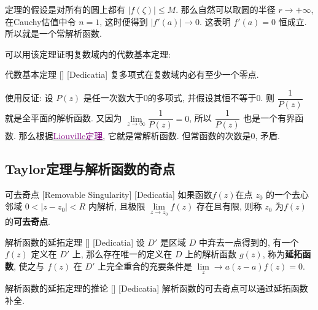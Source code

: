 \documentclass[UTF8]{ctexart}
\newcommand{\hyperrefc}[2]{\hyperref[#1]{\textcolor{purple}{#2}}}
\begin{document}
        \begin{prf}
            定理的假设是对所有的圆上都有 \(|f(\zeta)|\leqslant M\). 那么自然可以取圆的半径 \(r\to+\infty \), 在Cauchy估值中令 \(n=1\), 这时便得到 \(|f'(a)|\to 0\). 这表明 \(f'(a)=0\) 恒成立. 所以就是一个常解析函数. 
        \end{prf}

        可以用该定理证明复数域内的代数基本定理: 

        \begin{thm}
            [UUID]
            {代数基本定理}
            []
            [Dedicatia]
            复多项式在复数域内必有至少一个零点. 
        \end{thm}

        \begin{prf}
            使用反证: 设 \(P(z)\) 是任一次数大于0的多项式, 并假设其恒不等于0. 则 \(\dfrac{1}{P(z)}\) 就是全平面的解析函数. 又因为 \(\lim\limits_{z\to\infty}\dfrac{1}{P(z)}=0\), 所以 \(\dfrac{1}{P(z)}\) 也是一个有界函数. 那么根据\hyperrefc{thm:Liouville}{Liouville定理}, 它就是常解析函数. 但常函数的次数是0, 矛盾. 
        \end{prf}

    \subsection{Taylor定理与解析函数的奇点}

        \begin{dfn}
            [RemovableSingularity]
            {可去奇点}
            [Removable Singularity]
            [Dedicatia]
            如果函数\(f(z)\)在点 \(z_0\) 的一个去心邻域 \(0 < |z - z_0| < R\) 内解析, 且极限 \(\lim\limits_{z \to z_0} f(z)\) 存在且有限, 则称 \(z_0\) 为\(f(z)\)的\textbf{可去奇点}. 
        \end{dfn}

        \begin{thm}
            [UUID]
            {解析函数的延拓定理}
            []
            [Dedicatia]
            设 \(D'\) 是区域 \(D\) 中弃去一点得到的, 有一个  \(f(z)\) 定义在 \(D'\) 上, 那么存在唯一的定义在 \(D\) 上的解析函数 \(g(z)\), 称为\textbf{延拓函数}, 使之与 \(f(z)\) 在 \(D'\) 上完全重合的充要条件是 \(\lim\limits_z\to a(z-a)f(z)=0\).
        \end{thm}

        \begin{crl}
            [UUID]
            {解析函数的延拓定理的推论}
            []
            [Dedicatia]
            解析函数的可去奇点可以通过延拓函数补全. 
        \end{crl}
\end{document}
